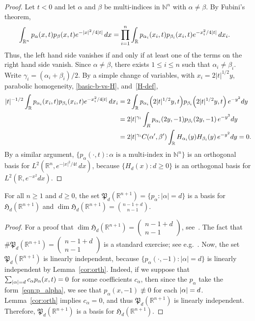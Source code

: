 \documentclass[AHL,Unicode,longabstracts,published]{cedram}
\newcommand{\N}{\mathbb{N}}
\newcommand{\R}{\mathbb{R}}
\newcommand{\abs}[1]{\left \lvert #1 \right \rvert}
\newcommand{\HCP}[1]{\mathfrak{H}_{#1}}
\newcommand{\fkP}{\mathfrak{P}}
\let\originalleft\left
\let\originalright\right
\renewcommand{\left}{\mathopen{}\mathclose\bgroup\originalleft}
\renewcommand{\right}{\aftergroup\egroup\originalright}
\newcommand{\R}{\mathbb{R}}
\begin{document}
\begin{proof}
Let $t<0$ and let $\alpha$ and $\beta$ be multi-indices in $\N^n$ with $\alpha\neq\beta$. By Fubini's theorem,
\begin{align*}
\int_{\R^n} p_\alpha(x,t) p_\beta(x,t) e^{-\abs{x}^2/ 4\abs{t}} \, dx & = \prod_{i=1}^n \int_{\R} p_{\alpha_i}(x_i, t) p_{\beta_i}(x_i,t) e^{-x_i^2 / 4 \abs{t}} \, dx_i.
\end{align*}
Thus, the left hand side vanishes if and only if at least one of the terms on the right hand side vanish. Since $\alpha\neq\beta$, there exists $1\leq i\leq n$ such that $\alpha_i\neq \beta_i$. Write $\gamma_i=(\alpha_i+\beta_i)/2$. By a simple change of variables, with $x_i=2|t|^{1/2}y$, parabolic homogeneity, \eqref{basic-b-vs-H}, and~\eqref{H-def},
\begin{align*}
|t|^{-1/2}\int_{\R} p_{\alpha_i}(x_i, t) p_{\beta_i}(x_i,t) e^{-x_i^2 / 4 \abs{t}} \, dx_i &= 2\int_\R p_{\alpha_i}\left(2|t|^{1/2}y,t\right) p_{\beta_i}\left(2|t|^{1/2}y,t\right)\,e^{-y^2}dy\\ &=2|t|^{\gamma_i}\int_R p_{\alpha_i}(2y,-1) p_{\beta_i}(2y,-1)\,e^{-y^2}dy\\
&=2|t|^{\gamma_i}C(\alpha',\beta')\int_{\R}H_{\alpha_i}(y) H_{\beta_i}(y)\,e^{-y^2}dy=0.
\end{align*}
By a similar argument, $\{p_\alpha(\cdot,t):\alpha\text{ is a multi-index in }\N^n\}$ is an orthogonal basis for $L^2(\R^n,e^{-|x|^2/4t}\,dx)$, because $\{H_d(x):d\geq 0\}$ is an orthogonal basis for\linebreak $L^2(\R, e^{-x^2}dx)$.
\end{proof}

\begin{lemm}\label{lem:gen}
For all $n\geq 1$ and $d\geq 0$, the set $\fkP_{d}(\R^{n+1})=\{p_\alpha:|\alpha|=d\}$ is a basis for $\HCP{d}(\R^{n+1})$ and $\dim \HCP{d}(\R^{n+1})=\binom{n-1+d}{n-1}$.
\end{lemm}

\begin{proof}
For a proof that $\dim \HCP{d}(\R^{n+1})=(
\begin{smallmatrix}
n-1+d\\n-1
\end{smallmatrix})$, see~\cite[Lemma~2.2]{CM21}. The fact that $\#\fkP_d(\R^{n+1})=(
\begin{smallmatrix}
n-1+d\\
n-1
\end{smallmatrix})$ is a standard exercise; see e.g.~\cite[p.~12]{Evans-PDE}. Now, the set $\fkP_{d}(\R^{n+1})$ is linearly independent, because $\{p_{\alpha}(\cdot,-1):|\alpha|=d\}$ is linearly independent by Lemma~\ref{cor:orth}. {Indeed, if we suppose that $\sum_{\abs{\alpha} = d} c_\alpha p_\alpha(x,t) = 0$ for some coefficients $c_\alpha$, then since the $p_\alpha$ take the form~\eqref{eqn:p_alpha}, we see that $p_\alpha(x,-1) \not \equiv 0$ for each $\abs{\alpha} = d$. Lemma~\ref{cor:orth} implies $c_\alpha =0$, and thus $\fkP_d(\R^{n+1})$ is linearly independent.} Therefore, $\fkP_d(\R^{n+1})$ is a basis for $\HCP{d}(\R^{n+1})$.
\end{proof}
\end{document}
